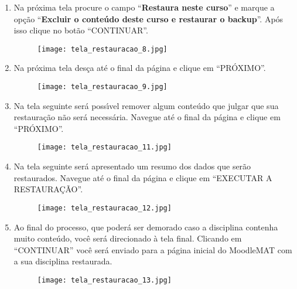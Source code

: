 \documentclass[12pt]{report}
\begin{document}
\begin{enumerate}[\bf 1)]
  	\newpage

	\item Na pr\'oxima tela procure o campo ``\textbf{Restaura neste curso}'' e marque a op\c{c}\~ao ``\textbf{Excluir o conte\'udo deste curso e restaurar o backup}''. Ap\'os isso clique no bot\~ao ``CONTINUAR''.
	\begin{figure}[H]
    	\centering
    	\hspace*{-2.5cm}\texttt{[image: tela\_restauracao\_8.jpg]}
  	\end{figure}
	
	\newpage

	\item Na pr\'oxima tela des\c{c}a at\'e o final da p\'agina e clique em ``PR\'OXIMO''.
	\begin{figure}[H]
    	\centering
    	\hspace*{-2.5cm}\texttt{[image: tela\_restauracao\_9.jpg]}
  	\end{figure}

  	\newpage

	\item Na tela seguinte ser\'a poss{\'\i}vel remover algum conte\'udo que julgar que sua restaura\c{c}\~ao n\~ao ser\'a necess\'aria. Navegue at\'e o final da p\'agina e clique em ``PR\'OXIMO''.
	\begin{figure}[H]
    	\centering
    	\hspace*{-2.5cm}\texttt{[image: tela\_restauracao\_11.jpg]}
  	\end{figure}
	
	\newpage

	\item Na tela seguinte ser\'a apresentado um resumo dos dados que ser\~ao restaurados. Navegue at\'e o final da p\'agina e clique em ``EXECUTAR A RESTAURA\c{C}\~AO''.
	\begin{figure}[H]
    	\centering
    	\hspace*{-2.5cm}\texttt{[image: tela\_restauracao\_12.jpg]}
  	\end{figure}
	
	\newpage

	\item Ao final do processo, que poder\'a ser demorado caso a disciplina contenha muito conte\'udo, voc\^e ser\'a direcionado \`a tela final. Clicando em ``CONTINUAR'' voc\^e ser\'a enviado para a p\'agina inicial do MoodleMAT com a sua disciplina restaurada.
	\begin{figure}[H]
    	\centering
    	\hspace*{-2.5cm}\texttt{[image: tela\_restauracao\_13.jpg]}
  	\end{figure}
\end{enumerate}
\end{document}
